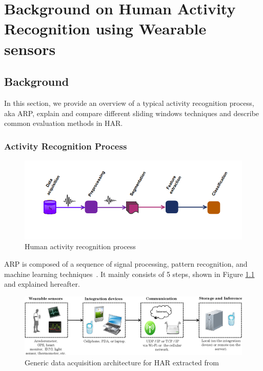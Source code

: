 \chapter{Background on Human Activity Recognition using Wearable sensors} \label{chap:background}
\section{Background }
In this section, we provide an overview of a typical activity recognition process, aka ARP, explain and compare different sliding windows techniques and describe common evaluation methods in HAR.
\subsection{Activity Recognition Process}\label{subsec:ARP}

\begin{figure}[ht]
    \centering
    \includegraphics[width=1\textwidth]{Figures/HARP.png}
    \caption{Human activity recognition process}
    \label{fig:tsprocess}
\end{figure}

ARP is composed of a sequence of signal processing, pattern recognition, and 
machine learning techniques~\cite{bulling2014tutorial}. It mainly 
consists of 5 steps, shown in Figure \ref{fig:tsprocess} and 
explained hereafter.

\begin{figure}[ht]
    \centering
    \includegraphics[width=.9\textwidth]{Figures/general_data_acqu.png}
    \caption{Generic data acquisition architecture for HAR extracted from~\cite{lara2012survey}}
    \label{fig:data_aqc}
\end{figure}

